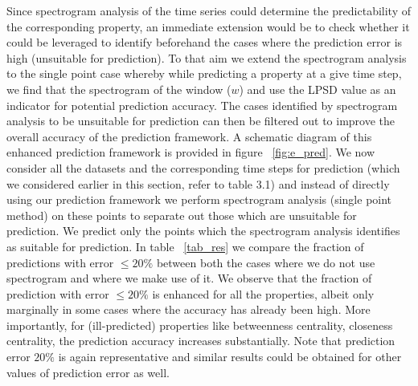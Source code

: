 Since spectrogram analysis of the time series could determine the predictability of the corresponding property, 
an immediate extension would be to check whether it could be leveraged to identify beforehand the cases where the prediction error is high (unsuitable for prediction). 
To that aim we extend the spectrogram analysis to the single point case whereby  
 while predicting a property at a give time step, we find that the spectrogram of the window ($w$) and use the LPSD value as an indicator for potential prediction accuracy. 
 The cases identified by spectrogram analysis to be unsuitable for prediction can then be filtered out to improve the overall accuracy of the prediction framework. 
  A schematic diagram of this enhanced prediction framework is 
 provided in figure ~\ref{fig:e_pred}.
We now consider all the datasets and the corresponding time steps for prediction (which we considered earlier in this section, refer to table 3.1) and  
instead of directly using our prediction framework we 
 perform spectrogram analysis (single point method) on these points to separate out those which are unsuitable for prediction. We predict 
 only the points which the spectrogram analysis identifies as suitable for prediction.
 In table ~\ref{tab_res} we compare the fraction of predictions with 
 error $\leq 20\%$ between both the cases where we do not use spectrogram  and where we make use of it. 
 We observe that the fraction of prediction with error $\leq 20\%$ is enhanced for all the properties, albeit only marginally in some cases where the accuracy has already been high. 
 More importantly, for (ill-predicted) properties like betweenness centrality, closeness centrality, the prediction
accuracy increases substantially. 
 Note that prediction error $20\%$ is again representative and similar results 
 could be obtained for other values of prediction error as well.

